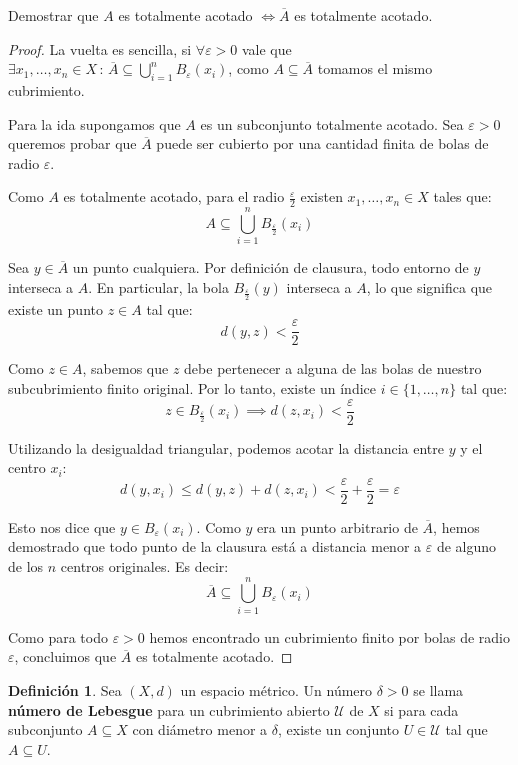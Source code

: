 \documentclass{article}
\theoremstyle{plain}
\theoremstyle{definition}
\newtheorem{definition}{Definición}[section]
\newcommand{\cl}[1]{\overline{#1}}              %
\newenvironment{ejercicio}[1]{\begin{trivlist}
\item[\hskip \labelsep {\bfseries Ejercicio}\hskip \labelsep {\bfseries #1.}]}{\end{trivlist}}
\begin{document}
\begin{ejercicio}{7}
    Demostrar que \( A \) es totalmente acotado \( \iff \cl{A} \) es totalmente acotado.
\end{ejercicio}
\begin{proof}
    La vuelta es sencilla, si \( \forall \varepsilon > 0 \) vale que \( \exists x_1, \ldots, x_n \in X \, : \, \cl{A} \subseteq \bigcup_{i = 1}^n B_\varepsilon(x_i) \), como \( A \subseteq \cl{A} \) tomamos el mismo cubrimiento.

    Para la ida supongamos que \( A \) es un subconjunto totalmente acotado. Sea \( \varepsilon > 0 \) queremos probar que \( \cl{A} \) puede ser cubierto por una cantidad finita de bolas de radio \( \varepsilon \).

    Como \( A \) es totalmente acotado, para el radio \( \frac{\varepsilon}{2} \) existen \( x_1, \dots, x_n \in X \) tales que:
    \[ A \subseteq \bigcup_{i=1}^n B_{\frac{\varepsilon}{2}}(x_i) \]

    Sea \( y \in \cl{A} \) un punto cualquiera. Por definición de clausura, todo entorno de \( y \) interseca a \( A \).
    En particular, la bola \( B_{\frac{\varepsilon}{2}}(y) \) interseca a \( A \), lo que significa que existe un punto \( z \in A \) tal que:
    \[ d(y, z) < \frac{\varepsilon}{2} \]

    Como \( z \in A \), sabemos que \( z \) debe pertenecer a alguna de las bolas de nuestro subcubrimiento finito original. Por lo tanto, existe un índice \( i \in \{1, \dots, n\} \) tal que:
    \[ z \in B_{\frac{\varepsilon}{2}}(x_i) \implies d(z, x_i) < \frac{\varepsilon}{2} \]

    Utilizando la desigualdad triangular, podemos acotar la distancia entre \( y \) y el centro \( x_i \):
    \[ d(y, x_i) \leq d(y, z) + d(z, x_i) < \frac{\varepsilon}{2} + \frac{\varepsilon}{2} = \varepsilon \]

    Esto nos dice que \( y \in B_{\varepsilon}(x_i) \). Como \( y \) era un punto arbitrario de \( \cl{A} \), hemos demostrado que todo punto de la clausura está a distancia menor a \( \varepsilon \) de alguno de los \( n \) centros originales. Es decir:
    \[ \cl{A} \subseteq \bigcup_{i=1}^n B_{\varepsilon}(x_i) \]

    Como para todo \( \varepsilon > 0 \) hemos encontrado un cubrimiento finito por bolas de radio \( \varepsilon \), concluimos que \( \cl{A} \) es totalmente acotado.
\end{proof}

\begin{definition}
    Sea \( (X, d) \) un espacio métrico. Un número \( \delta > 0 \) se llama \textbf{número de Lebesgue} para un cubrimiento abierto \( \mathcal{U} \) de \( X \) si para cada subconjunto \( A \subseteq X \) con diámetro menor a \( \delta \), existe un conjunto \( U \in \mathcal{U} \) tal que \( A \subseteq U \).
\end{definition}
\end{document}
